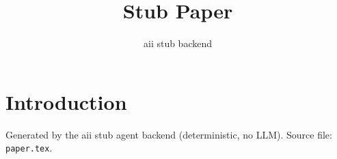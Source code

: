 \documentclass{article}
\title{Stub Paper}
\author{aii stub backend}
\begin{document}
\maketitle
\section{Introduction}
Generated by the aii stub agent backend (deterministic, no LLM). Source file: \texttt{paper.tex}.
\end{document}
